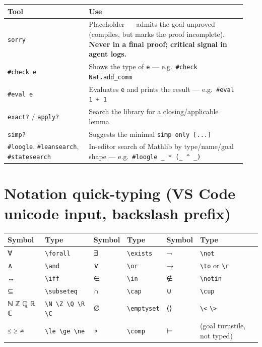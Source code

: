 \begin{center}
\begin{tabular}{@{}p{0.32\linewidth}p{0.62\linewidth}@{}}
\hline
\textbf{Tool} & \textbf{Use} \\
\hline
\texttt{sorry} & Placeholder --- admits the goal unproved (compiles, but marks the proof incomplete). \textbf{Never in a final proof; critical signal in agent logs.} \\
\texttt{\#check e} & Shows the type of \texttt{e} --- e.g.\ \texttt{\#check Nat.add\_comm} \\
\texttt{\#eval e} & Evaluates \texttt{e} and prints the result --- e.g.\ \texttt{\#eval 1 + 1} \\
\texttt{exact?} / \texttt{apply?} & Search the library for a closing/applicable lemma \\
\texttt{simp?} & Suggests the minimal \texttt{simp only [...]} \\
\texttt{\#loogle}, \texttt{\#leansearch}, \texttt{\#statesearch} & In-editor search of Mathlib by type/name/goal shape --- e.g.\ \texttt{\#loogle \_ * (\_ \textasciicircum{} \_)} \\
\hline
\end{tabular}
\end{center}

\section{Notation quick-typing (VS Code unicode input, backslash prefix)}

\begin{center}
\begin{tabular}{@{}llllll@{}}
\hline
\textbf{Symbol} & \textbf{Type} & \textbf{Symbol} & \textbf{Type} & \textbf{Symbol} & \textbf{Type} \\
\hline
∀ & \texttt{\textbackslash{}forall} & ∃ & \texttt{\textbackslash{}exists} & ¬ & \texttt{\textbackslash{}not} \\
∧ & \texttt{\textbackslash{}and} & ∨ & \texttt{\textbackslash{}or} & → & \texttt{\textbackslash{}to} or \texttt{\textbackslash{}r} \\
↔ & \texttt{\textbackslash{}iff} & ∈ & \texttt{\textbackslash{}in} & ∉ & \texttt{\textbackslash{}notin} \\
⊆ & \texttt{\textbackslash{}subseteq} & ∩ & \texttt{\textbackslash{}cap} & ∪ & \texttt{\textbackslash{}cup} \\
ℕ ℤ ℚ ℝ ℂ & \texttt{\textbackslash{}N \textbackslash{}Z \textbackslash{}Q \textbackslash{}R \textbackslash{}C} & ∅ & \texttt{\textbackslash{}emptyset} & ⟨⟩ & \texttt{\textbackslash{}<} \texttt{\textbackslash{}>} \\
≤ ≥ ≠ & \texttt{\textbackslash{}le \textbackslash{}ge \textbackslash{}ne} & ∘ & \texttt{\textbackslash{}comp} & ⊢ & (goal turnstile, not typed) \\
\hline
\end{tabular}
\end{center}

